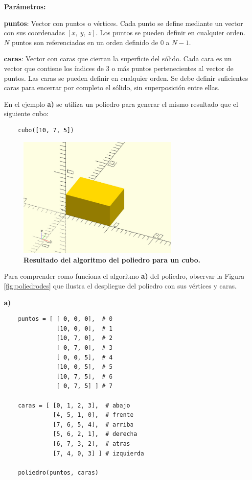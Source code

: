 \begin{description}
\item  \textbf{Parámetros:}
\item  \textbf{puntos}: Vector con puntos o vértices. Cada punto se define mediante un vector con sus coordenadas $[x,\ y,\ z]$.
Los puntos se pueden definir en cualquier orden. $N$ puntos son referenciados en un orden definido de $0$ a $N-1$.
\item  \textbf{caras}: Vector con caras que cierran la superficie del sólido. Cada cara es un vector que contiene los índices de 3 o más puntos pertenecientes al vector de puntos. 
Las caras se pueden definir en cualquier orden. Se debe definir suficientes caras para encerrar por completo el sólido, sin superposición entre ellas.
\end{description}

En el ejemplo \textbf{a)} se utiliza un poliedro para generar el mismo resultado que el siguiente cubo:

\begin{verbatim}
    cubo([10, 7, 5])
\end{verbatim}

\begin{figure}[h]
\includegraphics[width=8cm]{Img/Modelos/modelado9.jpg}
\centering
\caption{\textbf{\footnotesize{Resultado del algoritmo del poliedro para un cubo.}}}
\end{figure}

Para comprender como funciona el algoritmo \textbf{a)} del poliedro, observar la Figura \ref{fig:poliedrodes} que ilustra el despliegue del poliedro con sus vértices y caras.

\clearpage
\textbf{a)}
\begin{verbatim}
    puntos = [ [ 0, 0, 0],  # 0
               [10, 0, 0],  # 1
               [10, 7, 0],  # 2
               [ 0, 7, 0],  # 3
               [ 0, 0, 5],  # 4
               [10, 0, 5],  # 5
               [10, 7, 5],  # 6
               [ 0, 7, 5] ] # 7
  
    caras = [ [0, 1, 2, 3],  # abajo
              [4, 5, 1, 0],  # frente
              [7, 6, 5, 4],  # arriba
              [5, 6, 2, 1],  # derecha
              [6, 7, 3, 2],  # atras
              [7, 4, 0, 3] ] # izquierda
  
    poliedro(puntos, caras)

\end{verbatim}

